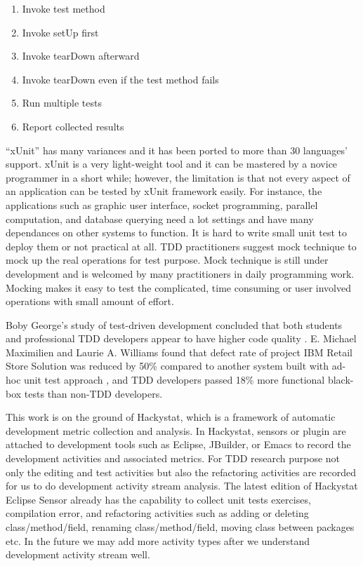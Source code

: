 \documentclass[11pt,twocolumn]{article}
\begin{document}
\begin{enumerate}
\item Invoke test method
\item Invoke setUp first
\item Invoke tearDown afterward
\item Invoke tearDown even if the test method fails
\item Run multiple tests
\item Report collected results
\end{enumerate}


``xUnit'' has many variances and it has been ported to more than 30
languages' support\cite{XPSoftware}. xUnit is a very light-weight tool and
it can be mastered by a novice programmer in a short while; however, the
limitation is that not every aspect of an application can be tested by xUnit
framework easily.  For instance, the applications such as graphic user
interface, socket programming, parallel computation, and database querying
need a lot settings and have many dependances on other systems to
function. It is hard to write small unit test to deploy them or not
practical at all. TDD practitioners suggest mock technique to mock up the
real operations for test purpose. Mock technique is still under development
and is welcomed by many practitioners in daily programming work. Mocking
makes it easy to test the complicated, time consuming or user involved
operations with small amount of effort.

Boby George's study of test-driven development concluded that both students
and professional TDD developers appear to have higher code quality
\cite{George_2002}. E. Michael Maximilien and Laurie A.  Williams found
that defect rate of project IBM Retail Store Solution was reduced by 50\%
compared to another system built with ad-hoc unit test approach
\cite{Maximilien_2003}, and TDD developers passed 18\% more functional
black-box tests than non-TDD developers.

\label{sec:app}

This work is on the ground of Hackystat, which is a framework of automatic
development metric collection and analysis. In Hackystat, sensors or plugin
are attached to development tools such as Eclipse, JBuilder, or Emacs to
record the development activities and associated metrics. For TDD research
purpose not only the editing and test activities but also the refactoring
activities are recorded for us to do development activity stream analysis.
The latest edition of Hackystat Eclipse Sensor already has the capability
to collect unit tests exercises, compilation error, and refactoring
activities such as adding or deleting class/method/field, renaming
class/method/field, moving class between packages etc. In the future we may
add more activity types after we understand development activity stream
well.
\end{document}
